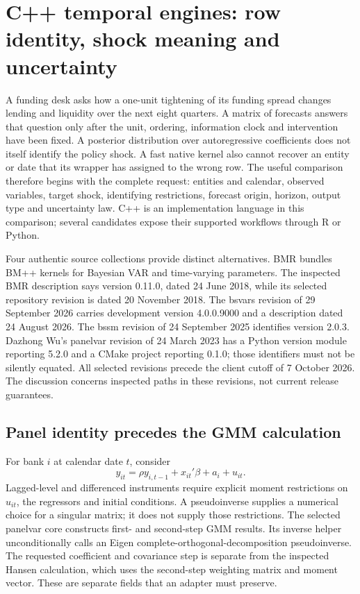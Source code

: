 \section{C++ temporal engines: row identity, shock meaning and uncertainty}
\label{sec:exec25-cxx-dynamic}

A funding desk asks how a one-unit tightening of its funding spread changes lending and liquidity over the next eight quarters. A matrix of forecasts answers that question only after the unit, ordering, information clock and intervention have been fixed. A posterior distribution over autoregressive coefficients does not itself identify the policy shock. A fast native kernel also cannot recover an entity or date that its wrapper has assigned to the wrong row. The useful comparison therefore begins with the complete request: entities and calendar, observed variables, target shock, identifying restrictions, forecast origin, horizon, output type and uncertainty law. C++ is an implementation language in this comparison; several candidates expose their supported workflows through R or Python.

Four authentic source collections provide distinct alternatives. BMR bundles BM++ kernels for Bayesian VAR and time-varying parameters. The inspected BMR description says version 0.11.0, dated 24 June 2018, while its selected repository revision is dated 20 November 2018. The bsvars revision of 29 September 2026 carries development version 4.0.0.9000 and a description dated 24 August 2026. The bssm revision of 24 September 2025 identifies version 2.0.3. Dazhong Wu's panelvar revision of 24 March 2023 has a Python version module reporting 5.2.0 and a CMake project reporting 0.1.0; those identifiers must not be silently equated. All selected revisions precede the client cutoff of 7 October 2026. The discussion concerns inspected paths in these revisions, not current release guarantees.\citep{exec25_cdyn_bmr,exec25_cdyn_bsvars,exec25_cdyn_bssm,exec25_cdyn_panelvar}

\subsection{Panel identity precedes the GMM calculation}

For bank $i$ at calendar date $t$, consider
\[
 y_{it}=\rho y_{i,t-1}+x_{it}'\beta+a_i+u_{it}.
\]
Lagged-level and differenced instruments require explicit moment restrictions on $u_{it}$, the regressors and initial conditions. A pseudoinverse supplies a numerical choice for a singular matrix; it does not supply those restrictions. The selected panelvar core constructs first- and second-step GMM results. Its inverse helper unconditionally calls an Eigen complete-orthogonal-decomposition pseudoinverse. The requested coefficient and covariance step is separate from the inspected Hansen calculation, which uses the second-step weighting matrix and moment vector. These are separate fields that an adapter must preserve.\citep{exec25_cdyn_panelvar}

